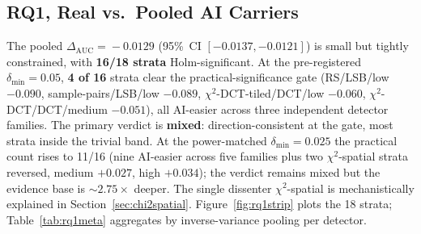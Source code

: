 \documentclass[10pt,twocolumn,a4paper]{article}
\begin{document}
\subsection{RQ1, Real vs.\ Pooled AI Carriers}
\label{sec:rq1}

The pooled $\Delta_\text{AUC}\!=\!-0.0129$ (95\%~CI $[-0.0137,-0.0121]$) is small but tightly constrained, with \textbf{16/18 strata} Holm-significant. At the pre-registered $\delta_\text{min}\!=\!0.05$, \textbf{4 of 16} strata clear the practical-significance gate (RS/LSB/low $-0.090$, sample-pairs/LSB/low $-0.089$, $\chi^2$-DCT-tiled/DCT/low $-0.060$, $\chi^2$-DCT/DCT/medium $-0.051$), all AI-easier across three independent detector families. The primary verdict is \textbf{mixed}: direction-consistent at the gate, most strata inside the trivial band. At the power-matched $\delta_\text{min}\!=\!0.025$ the practical count rises to 11/16 (nine AI-easier across five families plus two $\chi^2$-spatial strata reversed, medium $+0.027$, high $+0.034$); the verdict remains mixed but the evidence base is $\sim\!2.75\times\!$ deeper. The single dissenter $\chi^2$-spatial is mechanistically explained in Section~\ref{sec:chi2spatial}. Figure~\ref{fig:rq1strip} plots the 18 strata; Table~\ref{tab:rq1meta} aggregates by inverse-variance pooling per detector.
\end{document}
